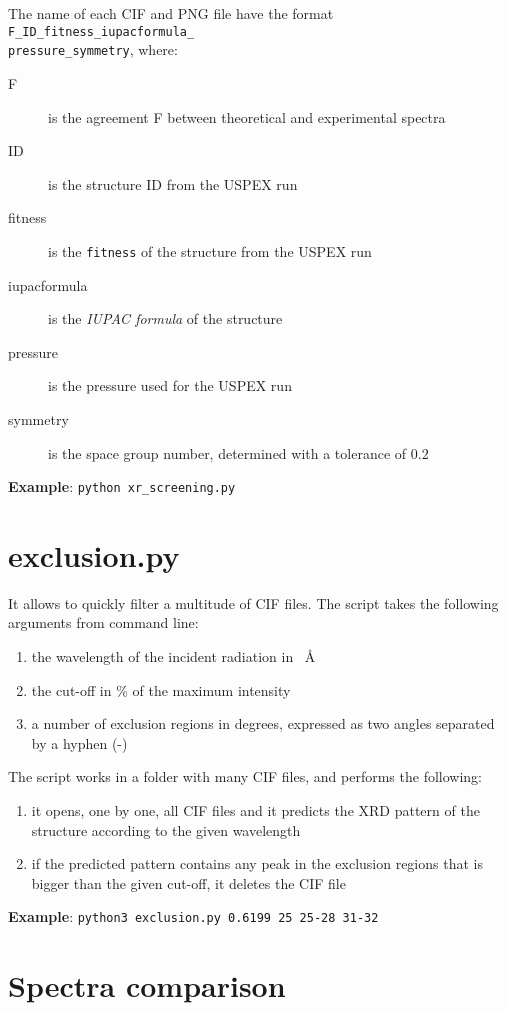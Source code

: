 \documentclass{article}
\begin{document}
The name of each CIF and PNG file have the format \texttt{F\_ID\_fitness\_iupacformula\_ \\ pressure\_symmetry}, where:
\begin{description}
	\item[F] is the agreement F between theoretical and experimental spectra
	\item[ID] is the structure ID from the USPEX run
	\item[fitness] is the \texttt{fitness} of the structure from the USPEX run
	\item[iupacformula] is the \emph{IUPAC formula} of the structure
	\item[pressure] is the pressure used for the USPEX run
	\item[symmetry] is the space group number, determined with a tolerance of $0.2$
\end{description}
\textbf{Example}: \texttt{python xr\_screening.py}

\section{exclusion.py}
It allows to quickly filter a multitude of CIF files. The script takes the following arguments from command line:
\begin{enumerate}
	\item the wavelength of the incident radiation in \SI{}{\angstrom}
	\item the cut-off in \% of the maximum intensity
	\item a number of exclusion regions in degrees, expressed as two angles separated by a hyphen (-)
\end{enumerate}
The script works in a folder with many CIF files, and performs the following:
\begin{enumerate}
	\item it opens, one by one, all CIF files and it predicts the XRD pattern of the structure according to the given wavelength
	\item if the predicted pattern contains any peak in the exclusion regions that is bigger than the given cut-off, it deletes the CIF file
\end{enumerate}
\textbf{Example}: \texttt{python3 exclusion.py 0.6199 25 25-28 31-32}

\appendix
\appendixpage

\section{Spectra comparison}
\label{sec:spectracomp}
\end{document}

